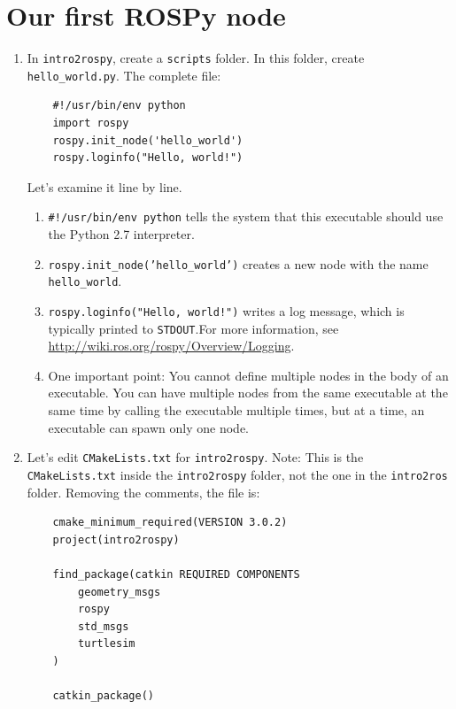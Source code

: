 \documentclass{article}
\begin{document}
    \section{Our first ROSPy node}
    \begin{enumerate}
        \item In \texttt{intro2rospy}, create a \texttt{scripts} folder. In this folder,
        create \texttt{hello\_world.py}. The complete file:
        \begin{verbatim}
    #!/usr/bin/env python
    import rospy
    rospy.init_node('hello_world')
    rospy.loginfo("Hello, world!")
        \end{verbatim}
        Let's examine it line by line.
        \begin{enumerate}
            \item \texttt{#!/usr/bin/env python} tells the system that this
            executable should use the Python 2.7 interpreter.
            \item \texttt{rospy.init_node('hello_world')} creates a new node
            with the name \texttt{hello\_world}.
            \item \texttt{rospy.loginfo("Hello, world!")} writes a log message,
             which is 
            typically printed to \texttt{STDOUT}.For more information, see 
            \url{http://wiki.ros.org/rospy/Overview/Logging}.
            \item One important point: You cannot define multiple nodes in the
            body of an executable. You can have multiple nodes from the same executable at the
            same time by calling the executable multiple times, 
            but at a time, an executable can spawn only one node.
        \end{enumerate}
        \item Let's edit \texttt{CMakeLists.txt} for \texttt{intro2rospy}.
         Note: This is the \texttt{CMakeLists.txt}
        inside the \texttt{intro2rospy} folder, not the one in the 
        \texttt{intro2ros} folder. Removing the comments, the file is:
        \begin{verbatim}
    cmake_minimum_required(VERSION 3.0.2)
    project(intro2rospy)
    
    find_package(catkin REQUIRED COMPONENTS
        geometry_msgs
        rospy
        std_msgs
        turtlesim
    )
    
    catkin_package()
    

\end{verbatim}
\end{enumerate}
\end{document}
